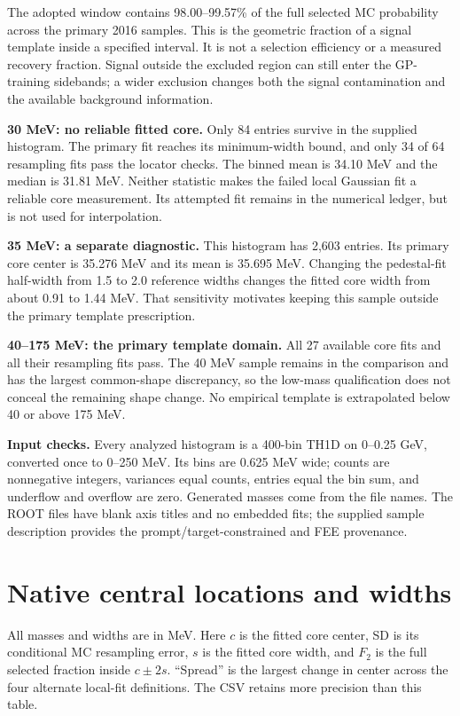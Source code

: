 \documentclass[11pt]{article}
\begin{document}
The adopted window contains 98.00--99.57\% of the full selected MC probability across the primary 2016 samples. This is the geometric fraction of a signal template inside a specified interval. It is not a selection efficiency or a measured recovery fraction. Signal outside the excluded region can still enter the GP-training sidebands; a wider exclusion changes both the signal contamination and the available background information.

\textbf{30 MeV: no reliable fitted core.} Only 84 entries survive in the supplied histogram. The primary fit reaches its minimum-width bound, and only 34 of 64 resampling fits pass the locator checks. The binned mean is 34.10 MeV and the median is 31.81 MeV. Neither statistic makes the failed local Gaussian fit a reliable core measurement. Its attempted fit remains in the numerical ledger, but is not used for interpolation.

\textbf{35 MeV: a separate diagnostic.} This histogram has 2,603 entries. Its primary core center is 35.276 MeV and its mean is 35.695 MeV. Changing the pedestal-fit half-width from 1.5 to 2.0 reference widths changes the fitted core width from about 0.91 to 1.44 MeV. That sensitivity motivates keeping this sample outside the primary template prescription.

\textbf{40--175 MeV: the primary template domain.} All 27 available core fits and all their resampling fits pass. The 40 MeV sample remains in the comparison and has the largest common-shape discrepancy, so the low-mass qualification does not conceal the remaining shape change. No empirical template is extrapolated below 40 or above 175 MeV.

\textbf{Input checks.} Every analyzed histogram is a 400-bin TH1D on 0--0.25 GeV, converted once to 0--250 MeV. Its bins are 0.625 MeV wide; counts are nonnegative integers, variances equal counts, entries equal the bin sum, and underflow and overflow are zero. Generated masses come from the file names. The ROOT files have blank axis titles and no embedded fits; the supplied sample description provides the prompt/target-constrained and FEE provenance.

\clearpage\section*{Native central locations and widths}

All masses and widths are in MeV. Here $c$ is the fitted core center, SD is its conditional MC resampling error, $s$ is the fitted core width, and $F_2$ is the full selected fraction inside $c\pm2s$. ``Spread'' is the largest change in center across the four alternate local-fit definitions. The CSV retains more precision than this table.
\end{document}
